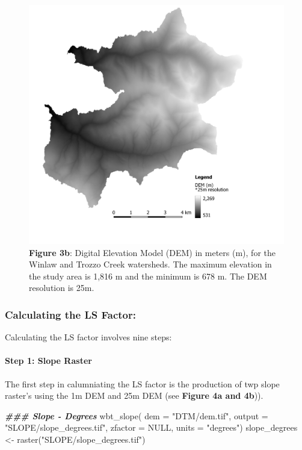 \documentclass[
]{article}
\newenvironment{Shaded}{\begin{snugshade}}{\end{snugshade}}
\newcommand{\AttributeTok}[1]{\textcolor[rgb]{0.77,0.63,0.00}{#1}}
\newcommand{\ConstantTok}[1]{\textcolor[rgb]{0.00,0.00,0.00}{#1}}
\newcommand{\DocumentationTok}[1]{\textcolor[rgb]{0.56,0.35,0.01}{\textbf{\textit{#1}}}}
\newcommand{\FunctionTok}[1]{\textcolor[rgb]{0.00,0.00,0.00}{#1}}
\newcommand{\NormalTok}[1]{#1}
\newcommand{\OtherTok}[1]{\textcolor[rgb]{0.56,0.35,0.01}{#1}}
\newcommand{\StringTok}[1]{\textcolor[rgb]{0.31,0.60,0.02}{#1}}
\begin{document}
\begin{figure}
\centering
\includegraphics{img/dem_25m.png}
\caption{\textbf{Figure 3b}: Digital Elevation Model (DEM) in meters (m), for the Winlaw and Trozzo Creek watersheds. The maximum elevation in the study area is 1,816 m and the minimum is 678 m. The DEM resolution is 25m.}
\end{figure}

\hypertarget{sec-calculating-the-ls-factor}{%
\subsubsection*{Calculating the LS Factor:}\label{sec-calculating-the-ls-factor}}

Calculating the LS factor involves nine steps:

\hypertarget{sec-step-1-ls}{%
\paragraph*{Step 1: Slope Raster}\label{sec-step-1-ls}}

The first step in calumniating the LS factor is the production of twp slope raster's using the 1m DEM and 25m DEM (see \textbf{Figure 4a and 4b})).

\begin{Shaded}
\begin{Highlighting}[]
\DocumentationTok{\#\#\# Slope {-} Degrees}
\FunctionTok{wbt\_slope}\NormalTok{(}
  \AttributeTok{dem =} \StringTok{"DTM/dem.tif"}\NormalTok{, }
  \AttributeTok{output =} \StringTok{"SLOPE/slope\_degrees.tif"}\NormalTok{,}
  \AttributeTok{zfactor =} \ConstantTok{NULL}\NormalTok{, }
  \AttributeTok{units =} \StringTok{"degrees"}\NormalTok{)}
\NormalTok{slope\_degrees }\OtherTok{\textless{}{-}} \FunctionTok{raster}\NormalTok{(}\StringTok{"SLOPE/slope\_degrees.tif"}\NormalTok{)}
\end{Highlighting}
\end{Shaded}
\end{document}
